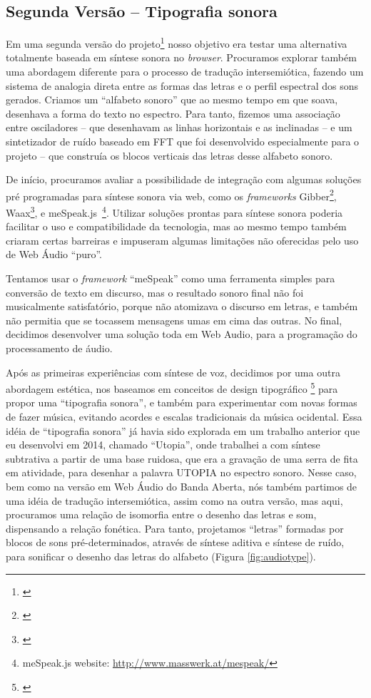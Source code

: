 \subsection{Segunda Versão -- Tipografia sonora}
Em uma segunda versão do projeto\footnote{\cite{Stolfi2017w}} nosso objetivo era testar uma alternativa totalmente baseada em síntese sonora no \emph{browser}. Procuramos explorar também uma abordagem diferente para o processo de tradução intersemiótica, fazendo um sistema de analogia direta entre as formas das letras e o perfil espectral dos sons gerados. Criamos um ``alfabeto sonoro'' que ao mesmo tempo em que soava, desenhava a forma do texto no espectro. Para tanto, fizemos uma associação entre osciladores -- que desenhavam as linhas horizontais e as inclinadas -- e um sintetizador de ruído baseado em FFT que foi desenvolvido especialmente para o projeto -- que construía os blocos verticais das letras desse alfabeto sonoro.


De início, procuramos avaliar a possibilidade de integração com algumas soluções pré programadas para síntese sonora via web, como os \emph{frameworks} Gibber\footnote{\cite{Roberts2012gibberlivecoding}}, Waax\footnote{\cite{Choi2013waax}}, e meSpeak.js~\footnote{meSpeak.js website: \url{http://www.masswerk.at/mespeak/}}. Utilizar soluções prontas para síntese sonora poderia facilitar o uso e compatibilidade da tecnologia, mas ao mesmo tempo também criaram certas barreiras e impuseram algumas limitações não oferecidas pelo uso de Web Áudio ``puro''. 

Tentamos usar o \emph{framework} ``meSpeak'' como uma ferramenta simples para conversão de texto em discurso, mas o resultado sonoro final não foi musicalmente satisfatório, porque não atomizava o discurso em letras, e também não permitia que se tocassem mensagens umas em cima das outras. No final, decidimos desenvolver uma solução toda em Web Audio, para a programação do processamento de áudio.


Após as primeiras experiências com síntese de voz, decidimos por uma outra abordagem estética, nos baseamos em conceitos de design tipográfico \footnote{\cite{ruder_typography:_2009}} para propor uma ``tipografia sonora'', e também para experimentar com novas formas de fazer música, evitando acordes e escalas tradicionais da música ocidental. Essa idéia de ``tipografia sonora'' já havia sido explorada em um trabalho anterior que eu desenvolvi em 2014, chamado ``Utopia'', onde trabalhei a com síntese subtrativa a partir de uma base ruidosa, que era a gravação de uma serra de fita em atividade, para desenhar a palavra UTOPIA no espectro sonoro. Nesse caso, bem como na versão em Web Áudio do Banda Aberta, nós também partimos de uma idéia de tradução intersemiótica, assim como na outra versão, mas aqui, procuramos uma relação de isomorfia entre o desenho das letras e som, dispensando a relação fonética. Para tanto, projetamos ``letras'' formadas por blocos de sons pré-determinados, através de síntese aditiva e síntese de ruído, para sonificar o desenho das letras do alfabeto (Figura \ref{fig:audiotype}).

